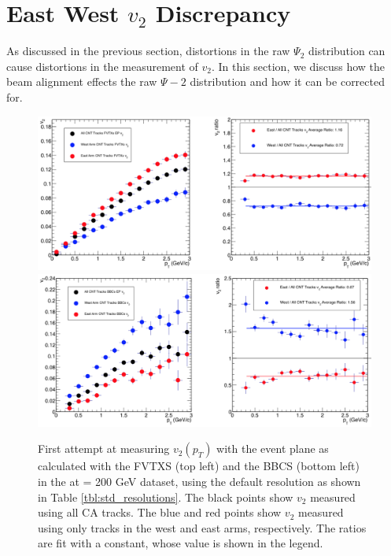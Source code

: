 \section{East West $v_2$ Discrepancy}
As discussed in the previous section, distortions in the raw $\Psi_2$ distribution can cause distortions in the measurement of $v_2$. In this section, we discuss how the beam alignment effects the raw $\Psi-2$ distribution and how it can be corrected for.
\begin{figure}[!h]
\begin{center}
\includegraphics[width=0.85\linewidth]{figs/fvtxs_default_ew.png}
\includegraphics[width=0.85\linewidth]{figs/bbcs_default_ew.png}
\caption{First attempt at measuring $v_{2} (p_T)$ with the event plane as calculated with the FVTXS (top left) and the BBCS (bottom left) in the \pau at \sqsn = 200 GeV dataset, using the default resolution as shown in Table \ref{tbl:std_resolutions}. The black points show $v_2$ measured using all CA tracks. The blue and red points show $v_2$ measured using only tracks in the west and east arms, respectively. The ratios are fit with a constant, whose value is shown in the legend.}
\label{fig:fvtx_ew_default}
\end{center}
\end{figure}


